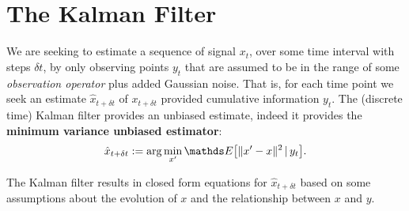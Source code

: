 \section{The Kalman Filter}

We are seeking to estimate a sequence of signal $x_t$, over some
time interval with steps $\delta t$, by only observing points $y_t$ that are assumed
to be in the range of some \emph{observation operator} plus added Gaussian noise.
That is, for each time point we seek an estimate $\hat{x}_{t+\delta t}$ of 
$x_{t+\delta t}$ provided cumulative information $y_t$. The (discrete time)
Kalman filter provides an unbiased estimate, indeed it provides the
\textbf{minimum variance unbiased estimator}:
\[
\hat{x}_{t+\delta t} := \arg\min_{x'} \expect{\|x' - x\|^2 \given y_t}.
\]

The Kalman filter results in closed form equations for $\hat{x}_{t+\delta t}$ based
on some assumptions about the evolution of $x$ and the relationship between
$x$ and $y$.

\iffalse
\begin{itemize}
    \item Singular evolutive extended Kalman filter (SEEK)
approximates the error covariance matrix by a singular low rank matrix, and makes correction only in those directions associated with the singular basis
    \item adding control to \eqref{eq:state_and_observation_equations}?
    \item filter inbreeding (P. Houtekamer and H. Mitchell. Data assimilation using an ensemble Kalman filter technique)
    \item Local ensemble transform Kalman filter
    \item 3D and 4D VaR
    \item Extensions \& Nonlinear Filtering
\end{itemize}

In this section, we describe the Kalman filter \cite{kalman1960new}, a predictive 
linear Gaussian filter whose the objective is generate a sequence of estimates of
a Gaussian random variable given a sequence of measurements. 
i.e. the posterior $\rho(X|Y)$ of a system i.e. the 
probability of $X\in\mathcal{X}$ given $y\in\mathcal{Y}$, via Bayes' rule:
\begin{equation}\label{bayesrule}
\rho(X|Y) \propto \rho(X)\rho(Y|X),
\end{equation}
for some prior information $\rho(X)\sim \mathcal{N}(\mu, C)$ about a state $X$ and likelihood $\rho(Y|X)$ of a prediction $Y|X\in\mathcal{Y}$.
\fi

